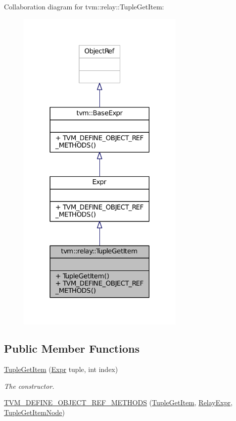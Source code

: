 Collaboration diagram for tvm\+:\+:relay\+:\+:Tuple\+Get\+Item\+:
\nopagebreak
\begin{figure}[H]
\begin{center}
\leavevmode
\includegraphics[width=230pt]{classtvm_1_1relay_1_1TupleGetItem__coll__graph}
\end{center}
\end{figure}
\subsection*{Public Member Functions}
\begin{DoxyCompactItemize}
\item 
\hyperlink{classtvm_1_1relay_1_1TupleGetItem_aabfb79c882374b5ba338a0f648f3a137}{Tuple\+Get\+Item} (\hyperlink{namespacetvm_1_1relay_a5b84e3790f89bb3fad5c7911eeb99531}{Expr} tuple, int index)
\begin{DoxyCompactList}\small\item\em The constructor. \end{DoxyCompactList}\item 
\hyperlink{classtvm_1_1relay_1_1TupleGetItem_adaace390cd6dc757a368386b647b5a07}{T\+V\+M\+\_\+\+D\+E\+F\+I\+N\+E\+\_\+\+O\+B\+J\+E\+C\+T\+\_\+\+R\+E\+F\+\_\+\+M\+E\+T\+H\+O\+DS} (\hyperlink{classtvm_1_1relay_1_1TupleGetItem}{Tuple\+Get\+Item}, \hyperlink{classtvm_1_1RelayExpr}{Relay\+Expr}, \hyperlink{classtvm_1_1relay_1_1TupleGetItemNode}{Tuple\+Get\+Item\+Node})
\end{DoxyCompactItemize}


